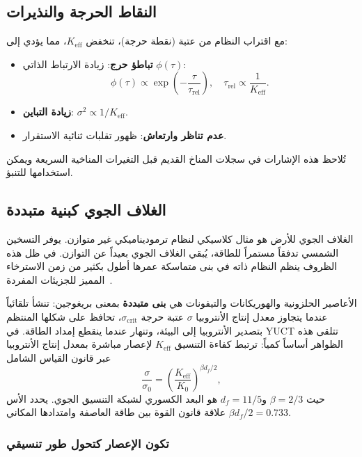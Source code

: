 \documentclass[11pt,a4paper]{article}
\newcommand{\Keff}{K_{\mathrm{eff}}}
\begin{document}
	\subsection{النقاط الحرجة والنذيرات}
	
	مع اقتراب النظام من عتبة (نقطة حرجة)، تنخفض \(\Keff\)، مما يؤدي إلى:
	\begin{itemize}
		\item \textbf{تباطؤ حرج}: زيادة الارتباط الذاتي \(\phi(\tau)\):
		\[
		\phi(\tau) \propto \exp\!\left(-\frac{\tau}{\tau_{\text{rel}}}\right),\quad \tau_{\text{rel}} \propto \frac{1}{\Keff}.
		\]
		\item \textbf{زيادة التباين}: \(\sigma^2 \propto 1/\Keff\).
		\item \textbf{عدم تناظر وارتعاش}: ظهور تقلبات ثنائية الاستقرار.
	\end{itemize}
	تُلاحظ هذه الإشارات في سجلات المناخ القديم قبل التغيرات المناخية السريعة ويمكن استخدامها للتنبؤ.
	
	\subsection{الغلاف الجوي كبنية متبددة}
	\label{subsec:atmo_diss}
	
	الغلاف الجوي للأرض هو مثال كلاسيكي لنظام ترموديناميكي غير متوازن. يوفر التسخين الشمسي تدفقاً مستمراً للطاقة، يُبقي الغلاف الجوي بعيداً عن التوازن. في ظل هذه الظروف ينظم النظام ذاته في بنى متماسكة عمرها أطول بكثير من زمن الاسترخاء المميز للجزيئات المفردة~\cite{Prigogine1977}.
	
	الأعاصير الحلزونية والهوريكانات والتيفونات هي \textbf{بنى متبددة} بمعنى بريغوجين: تنشأ تلقائياً عندما يتجاوز معدل إنتاج الأنتروبيا \(\sigma\) عتبة حرجة \(\sigma_{\mathrm{crit}}\)، تحافظ على شكلها المنتظم بتصدير الأنتروبيا إلى البيئة، وتنهار عندما ينقطع إمداد الطاقة. في YUCT تتلقى هذه الظواهر أساساً كمياً: ترتبط كفاءة التنسيق \(\Keff\) لإعصار مباشرة بمعدل إنتاج الأنتروبيا عبر قانون القياس الشامل
	\begin{equation}
		\frac{\sigma}{\sigma_0} = \left( \frac{\Keff}{K_0} \right)^{\beta d_f / 2},
		\label{eq:cyclone_sigma}
	\end{equation}
	حيث \(\beta = 2/3\) و\(d_f = 11/5\) هو البعد الكسوري لشبكة التنسيق الجوي. يحدد الأس \(\beta d_f / 2 = 0.733\) علاقة قانون القوة بين طاقة العاصفة وامتدادها المكاني.
	
	\subsubsection*{تكون الإعصار كتحول طور تنسيقي}
	
\end{document}
